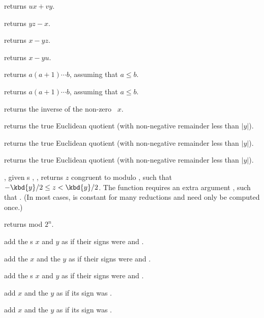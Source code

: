  returns $ux + vy$.

 returns $yz - x$.

 returns $x - yz$.

 returns $x -yu$.

 returns $a(a+1)\cdots b$, assuming
that $a \leq b$.

 returns $a(a+1)\cdots b$, assuming
that $a \leq b$.

 returns the inverse of the non-zero ~$x$.

 returns the true Euclidean quotient
(with non-negative remainder less than $|y|$).

 returns the true Euclidean quotient
(with non-negative remainder less than $|y|$).

 returns the true Euclidean quotient
(with non-negative remainder less than $|y|$).

, given
s , , returns $z$ congruent to  modulo ,
such that $-\kbd{y}/2 \leq z < \kbd{y}/2$. The function requires an extra
argument , such that . (In most cases, 
is constant for many reductions and  need only be computed once.)

 returns  mod $2^n$.

 add the s
$x$ and $y$ as if their signs were  and .

add the  $x$ and the  $y$ as if their signs were 
and .

 add the s $x$
and $y$ as if their signs were  and .

 add $x$ and the  $y$
as if its sign was .

 add $x$ and the  $y$
as if its sign was .


